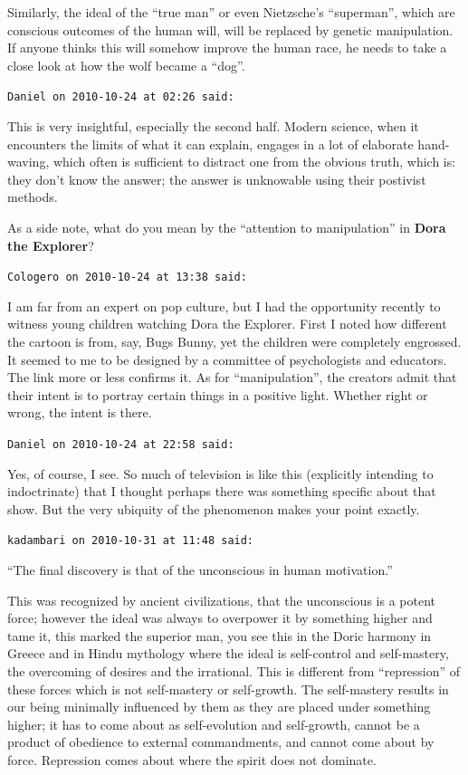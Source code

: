 \begin{footnotesize}
\begin{sffamily}
Similarly, the ideal of the ``true man'' or even Nietzsche's ``superman'', which are conscious outcomes of the human will, will be replaced by genetic manipulation. If anyone thinks this will somehow improve the human race, he needs to take a close look at how the wolf became a ``dog''.

\hfill

\texttt{Daniel on 2010-10-24 at 02:26 said:}

This is very insightful, especially the second half. Modern science, when it encounters the limits of what it can explain, engages in a lot of elaborate hand-waving, which often is sufficient to distract one from the obvious truth, which is: they don't know the answer; the answer is unknowable using their postivist methods.

As a side note, what do you mean by the ``attention to manipulation'' in \textbf{Dora the Explorer}?


\hfill

\texttt{Cologero on 2010-10-24 at 13:38 said:}

I am far from an expert on pop culture, but I had the opportunity recently to witness young children watching Dora the Explorer. First I noted how different the cartoon is from, say, Bugs Bunny, yet the children were completely engrossed. It seemed to me to be designed by a committee of psychologists and educators. The link more or less confirms it. As for ``manipulation'', the creators admit that their intent is to portray certain things in a positive light. Whether right or wrong, the intent is there.

\hfill

\texttt{Daniel on 2010-10-24 at 22:58 said:}

Yes, of course, I see. So much of television is like this (explicitly intending to indoctrinate) that I thought perhaps there was something specific about that show. But the very ubiquity of the phenomenon makes your point exactly.

\hfill

\texttt{kadambari on 2010-10-31 at 11:48 said:}

``The final discovery is that of the unconscious in human motivation.''

This was recognized by ancient civilizations, that the unconscious is a potent force; however the ideal was always to overpower it by something higher and tame it, this marked the superior man, you see this in the Doric harmony in Greece and in Hindu mythology where the ideal is self-control and self-mastery, the overcoming of desires and the irrational. This is different from ``repression'' of these forces which is not self-mastery or self-growth. The self-mastery results in our being minimally influenced by them as they are placed under something higher; it has to come about as self-evolution and self-growth, cannot be a product of obedience to external commandments, and cannot come about by force. Repression comes about where the spirit does not dominate.


\end{sffamily}
\end{footnotesize}
